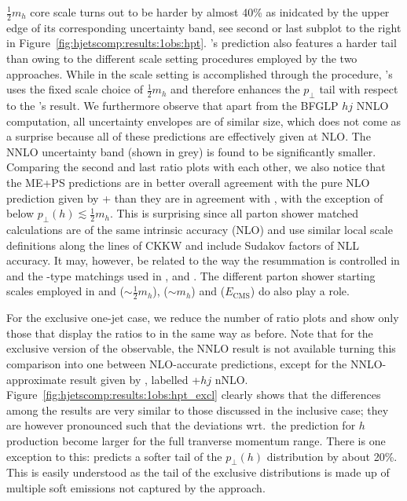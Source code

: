 $\tfrac{1}{2}m_h$ core scale turns out to be harder by almost 40\% as
inidcated by the upper edge of its corresponding uncertainty band, see
second or last subplot to the right in
Figure~\ref{fig:hjetscomp:results:1obs:hpt}. \Sherpa's \NNLOPS
prediction also features a harder tail than \Powheg owing to the
different scale setting procedures employed by the two approaches.
While in \Powheg the scale setting is accomplished through the \Minlo
procedure, \Sherpa's \NNLOPS uses the fixed scale choice of $\tfrac{1}{2}m_h$
and therefore enhances the $p_\perp$ tail with respect to the \Powheg's result. We
furthermore observe that apart from the BFGLP $hj$ NNLO computation, all
uncertainty envelopes are of similar size, which does not come as a
surprise because all of these predictions are effectively given at
NLO. The NNLO uncertainty band (shown in grey) is found to be
significantly smaller. Comparing the second and last ratio plots with
each other, we also notice that the ME+PS predictions are in better
overall agreement with the pure NLO prediction given by \GoSam{}+\Sherpa
than they are in agreement with \Powheg, with the exception of \MGaMC 
below $p_\perp(h)\lesssim \tfrac{1}{2}m_h$. This is surprising since all parton 
shower matched calculations are of the same intrinsic accuracy (NLO) and 
use similar local scale definitions along the lines of CKKW and include 
Sudakov factors of NLL accuracy. It may, however, be related to the way 
the resummation is controlled in \Powheg and the \MCatNLO-type matchings 
used in \MGaMC, \Herwig and \Sherpa. The different parton shower starting 
scales employed in \Herwig and \Sherpa ($\sim \tfrac{1}{2}m_h$), 
\MGaMC ($\sim m_h$) and \Powheg ($E_\text{CMS}$) do also play a role.

For the exclusive one-jet case, we reduce the number of ratio plots
and show only those that display the ratios to \Powheg in the same way
as before. Note that for the exclusive version of the observable, the
NNLO result is not available turning this comparison into one between
NLO-accurate predictions, except for the NNLO-approximate result given
by \Loopsim, labelled \GoSam{}+\Sherpa $hj$ nNLO.
Figure~\ref{fig:hjetscomp:results:1obs:hpt_excl} clearly shows that
the differences among the results are very similar to those discussed
in the inclusive case; they are however pronounced such that the
deviations wrt.~the \Powheg \NNLOPS prediction for $h$ production
become larger for the full tranverse momentum range. There is one
exception to this: \Loopsim predicts a softer tail of the $p_\perp(h)$
distribution by about 20\%. This is easily understood as the tail of 
the exclusive distributions is made up of multiple soft emissions not 
captured by the \Loopsim approach.

